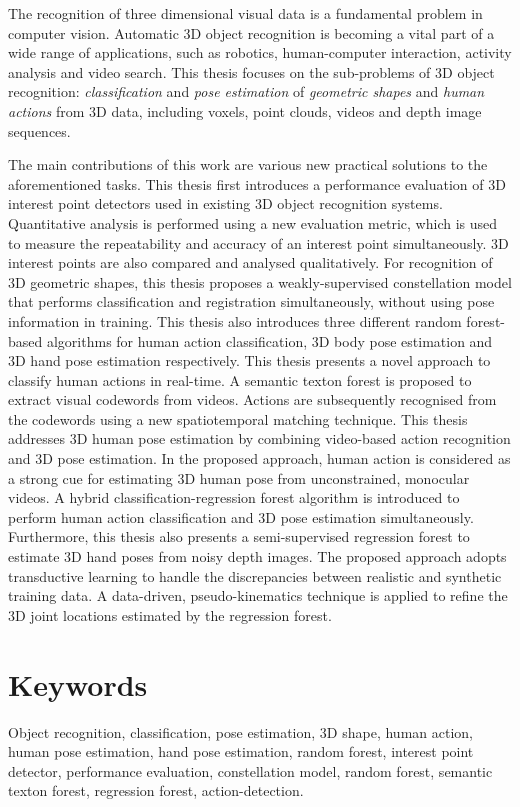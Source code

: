 
The recognition of three dimensional visual data is a fundamental problem in computer vision.  Automatic 3D object recognition is becoming a vital part of a wide range of applications, such as robotics, human-computer interaction, activity analysis and video search. This thesis focuses on the sub-problems of 3D object recognition: \emph{classification} and \emph{pose estimation} of \emph{geometric shapes} and \emph{human actions} from 3D data, including voxels, point clouds, videos and depth image sequences.  

The main contributions of this work are various new practical solutions to the aforementioned tasks. 
This thesis first introduces a performance evaluation of 3D interest point detectors used in existing 3D object recognition systems. Quantitative analysis is performed using a new evaluation metric, which is used to measure the repeatability and accuracy of an interest point simultaneously. 3D interest points are also compared and analysed qualitatively. For recognition of 3D geometric shapes, this thesis proposes a weakly-supervised constellation model that performs classification and registration simultaneously, without using pose information in training. 
This thesis also introduces three different random forest-based algorithms for human action classification, 3D body pose estimation and 3D hand pose estimation respectively. 
This thesis presents a novel approach to classify human actions in real-time. A semantic texton forest is proposed to extract visual codewords from videos. Actions are subsequently recognised from the codewords using a new spatiotemporal matching technique. 
This thesis addresses 3D human pose estimation by combining video-based action recognition and 3D pose estimation. In the proposed approach, human action is considered as a strong cue for estimating 3D human pose from unconstrained, monocular videos. A hybrid classification-regression forest algorithm is introduced to perform human action classification and 3D pose estimation simultaneously.  
Furthermore, this thesis also presents a semi-supervised regression forest to estimate 3D hand poses from noisy depth images. The proposed approach adopts transductive learning to handle the discrepancies between realistic and synthetic training data. A data-driven, pseudo-kinematics technique is applied to refine the 3D joint locations estimated by the regression forest.  

\newpage
\section{Keywords} Object recognition, classification, pose estimation, 3D shape, human action, human pose estimation, hand pose estimation, random forest, interest point detector, performance evaluation, constellation model, random forest, semantic texton forest, regression forest, action-detection. 



